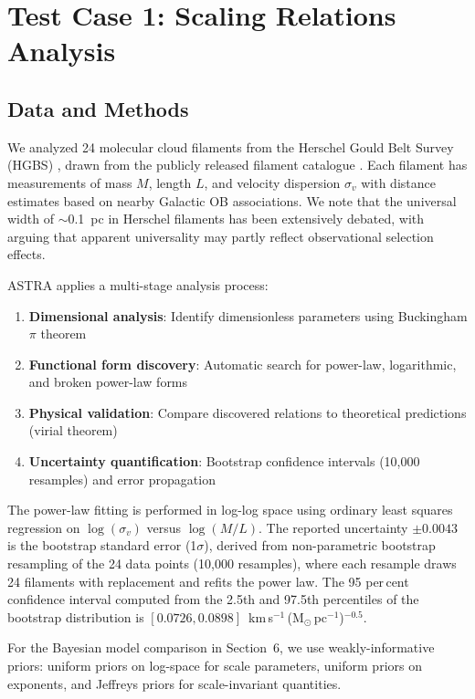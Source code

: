 \documentclass[usenatbib]{rasti}
\begin{document}
\section{Test Case 1: Scaling Relations Analysis}

\subsection{Data and Methods}

We analyzed 24 molecular cloud filaments from the Herschel Gould Belt Survey (HGBS) \citep{andre2010}, drawn from the publicly released filament catalogue \citep{arzoumanian2019}. Each filament has measurements of mass $M$, length $L$, and velocity dispersion $\sigma_v$ with distance estimates based on nearby Galactic OB associations. We note that the universal width of $\sim$0.1~pc in Herschel filaments has been extensively debated, with \citet{panopoulou2022} arguing that apparent universality may partly reflect observational selection effects.

ASTRA applies a multi-stage analysis process:
\begin{enumerate}
\item \textbf{Dimensional analysis}: Identify dimensionless parameters using Buckingham $\pi$ theorem
\item \textbf{Functional form discovery}: Automatic search for power-law, logarithmic, and broken power-law forms
\item \textbf{Physical validation}: Compare discovered relations to theoretical predictions (virial theorem)
\item \textbf{Uncertainty quantification}: Bootstrap confidence intervals (10,000 resamples) and error propagation
\end{enumerate}

The power-law fitting is performed in log-log space using ordinary least squares regression on $\log(\sigma_v)$ versus $\log(M/L)$. The reported uncertainty $\pm 0.0043$ is the bootstrap standard error (1$\sigma$), derived from non-parametric bootstrap resampling of the 24 data points (10,000 resamples), where each resample draws 24 filaments with replacement and refits the power law. The 95 per\,cent confidence interval computed from the 2.5th and 97.5th percentiles of the bootstrap distribution is $[0.0726, 0.0898]$~km\,s$^{-1}$\,(M$_\odot$\,pc$^{-1}$)$^{-0.5}$.

For the Bayesian model comparison in Section~6, we use weakly-informative priors: uniform priors on log-space for scale parameters, uniform priors on exponents, and Jeffreys priors for scale-invariant quantities.
\end{document}
